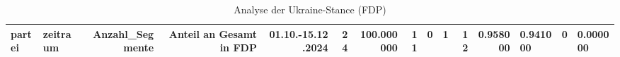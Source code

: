 \begin{table}
\caption{Analyse der Ukraine-Stance (FDP)}
\label{tab:meine_tabelle}
\begin{tabular}{llrrrrrrrrrr}
\toprule
partei & zeitraum & Anzahl_Segmente & Anteil an Gesamt in %
\midrule
FDP & 01.10.-15.12.2024 & 24 & 100.000000 & 11 & 0 & 1 & 12 & 0.958000 & 0.941000 & 0 & 0.000000 \\
\bottomrule
\end{tabular}
\end{table}
